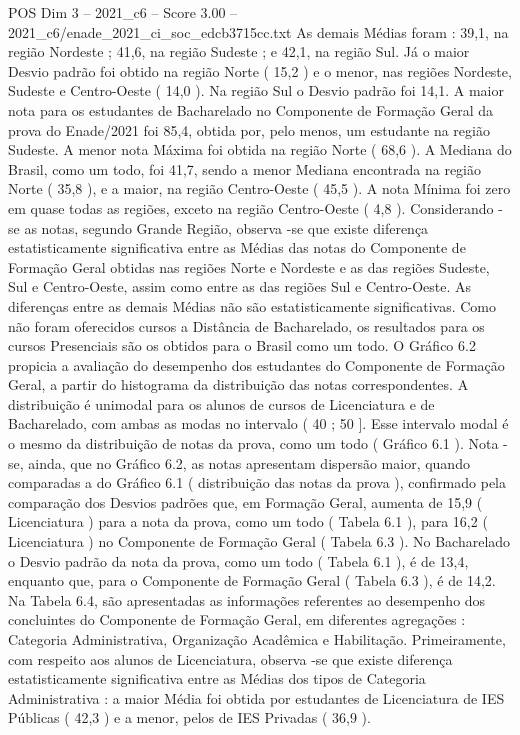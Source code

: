 \begin{textsample}{POS Dim 3 – 2021\_c6 – Score 3.00 – 2021\_c6/enade\_2021\_ci\_soc\_edcb3715cc.txt}
As demais Médias foram : 39,1, na região Nordeste ; 41,6, na região Sudeste ; e 42,1, na região Sul.
Já o maior Desvio padrão foi obtido na região Norte ( 15,2 ) e o menor, nas regiões Nordeste, Sudeste e Centro-Oeste ( 14,0 ).
Na região Sul o Desvio padrão foi 14,1.
A maior nota para os estudantes de Bacharelado no Componente de Formação Geral da prova do Enade/2021 foi 85,4, obtida por, pelo menos, um estudante na região Sudeste.
A menor nota Máxima foi obtida na região Norte ( 68,6 ).
A Mediana do Brasil, como um todo, foi 41,7, sendo a menor Mediana encontrada na região Norte ( 35,8 ), e a maior, na região Centro-Oeste ( 45,5 ).
A nota Mínima foi zero em quase todas as regiões, exceto na região Centro-Oeste ( 4,8 ).
Considerando -se as notas, segundo Grande Região, observa -se que existe diferença estatisticamente significativa entre as Médias das notas do Componente de Formação Geral obtidas nas regiões Norte e Nordeste e as das regiões Sudeste, Sul e Centro-Oeste, assim como entre as das regiões Sul e Centro-Oeste.
As diferenças entre as demais Médias não são estatisticamente significativas.
Como não foram oferecidos cursos a Distância de Bacharelado, os resultados para os cursos Presenciais são os obtidos para o Brasil como um todo.
O Gráfico 6.2 propicia a avaliação do desempenho dos estudantes do Componente de Formação Geral, a partir do histograma da distribuição das notas correspondentes.
A distribuição é unimodal para os alunos de cursos de Licenciatura e de Bacharelado, com ambas as modas no intervalo ( 40 ; 50 ].
Esse intervalo modal é o mesmo da distribuição de notas da prova, como um todo ( Gráfico 6.1 ).
Nota -se, ainda, que no Gráfico 6.2, as notas apresentam dispersão maior, quando comparadas a do Gráfico 6.1 ( distribuição das notas da prova ), confirmado pela comparação dos Desvios padrões que, em Formação Geral, aumenta de 15,9 ( Licenciatura ) para a nota da prova, como um todo ( Tabela 6.1 ), para 16,2 ( Licenciatura ) no Componente de Formação Geral ( Tabela 6.3 ).
No Bacharelado o Desvio padrão da nota da prova, como um todo ( Tabela 6.1 ), é de 13,4, enquanto que, para o Componente de Formação Geral ( Tabela 6.3 ), é de 14,2.
Na Tabela 6.4, são apresentadas as informações referentes ao desempenho dos concluintes do Componente de Formação Geral, em diferentes agregações : Categoria Administrativa, Organização Acadêmica e Habilitação.
Primeiramente, com respeito aos alunos de Licenciatura, observa -se que existe diferença estatisticamente significativa entre as Médias dos tipos de Categoria Administrativa : a maior Média foi obtida por estudantes de Licenciatura de IES Públicas ( 42,3 ) e a menor, pelos de IES Privadas ( 36,9 ).

\end{textsample}
